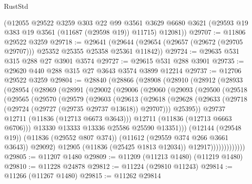 \begin{lexlean}{RustStd}
\begin{coremodule}
      (@12055
        @29522
        @3259
        @303
        @22
        @99
        @3561
        @3629
        @6680
        @3621
        (@29593 @19 @383 @19 @3561 (@11687 (@29598 @19)) @11715)
        @12081))
@29707 := @11806 @29522 @3259
@29718 := @29641
    (@29644 (@29654 (@29657 (@29672 (@29705 @29707))) @25352 @25355 @25358 @25361 @11842))
@29724 := @29635 @531 @315 @288 @27 @3901 @3574
@29727 := @29615 @531 @288 @3901
@29735 := @29620 @440 @288 @315 @27 @3643 @3574 @3899 @12214
@29737 := @12706 @29522 @3259
@29804 := @28840
    (@28866
      (@28908
        (@28910
          (@28912
            (@28933
              (@28954
                (@28969
                  (@28991
                    (@29002
                      (@29006
                        (@29060
                          (@29093
                            (@29500
                              (@29518
                                (@29565
                                  (@29570
                                    (@29579
                                      (@29603
                                        (@29613
                                          (@29618
                                            (@29628
                                              (@29633
                                                (@29718
                                                  (@29724 (@29727 (@29735 @29737 @13618)) @29707)))
                                              @25395))
                                          @29737
                                          @12711
                                          (@11836 (@12713 @6673 @3643)))
                                        @12711
                                        (@11836 (@12713 @6663 @6706)))
                                      @13330
                                      @13333
                                      @13336
                                      @25586
                                      @25590
                                      @13351)))
                                (@12144 (@29548 @19))
                                (@11836 (@29552 @807 @374))
                                (@11612 (@29559 @374 @266 @3661 @3643))
                                @29092)
                              @12905
                              (@11836 (@25425 @1813 @12034))
                              @12917)))))))))))))
@29805 := @11207 @1480
@29809 := @11209 (@11213 @1480) (@11219 @1480)
@29810 := @11228 @24878
@29812 := @11224 (@29810 @11243)
@29814 := @11266 (@11267 @1480)
@29815 := @11262 @29814

\end{coremodule}
\end{lexlean}
